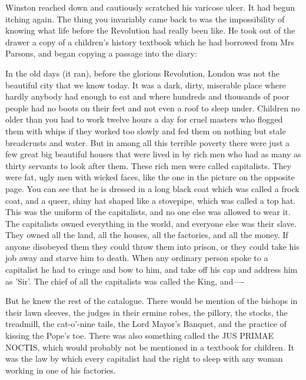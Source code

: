 \documentclass{article}
\begin{document}
Winston reached down and cautiously scratched his varicose ulcer. It
had begun itching again. The thing you invariably came back to was the
impossibility of knowing what life before the Revolution had really been
like. He took out of the drawer a copy of a children's history textbook
which he had borrowed from Mrs Parsons, and began copying a passage into
the diary:


   In the old days (it ran), before the glorious Revolution, London was
not the beautiful city that we know today. It was a dark, dirty, miserable
place where hardly anybody had enough to eat and where hundreds and
thousands of poor people had no boots on their feet and not even a roof to
sleep under. Children no older than you had to work twelve hours a day for
cruel masters who flogged them with whips if they worked too slowly and
fed them on nothing but stale breadcrusts and water. But in among all
this terrible poverty there were just a few great big beautiful houses
that were lived in by rich men who had as many as thirty servants to look
after them. These rich men were called capitalists. They were fat, ugly
men with wicked faces, like the one in the picture on the opposite page.
You can see that he is dressed in a long black coat which was called a
frock coat, and a queer, shiny hat shaped like a stovepipe, which was
called a top hat. This was the uniform of the capitalists, and no one else
was allowed to wear it. The capitalists owned everything in the world, and
everyone else was their slave. They owned all the land, all the houses,
all the factories, and all the money. If anyone disobeyed them they could
throw them into prison, or they could take his job away and starve him to
death. When any ordinary person spoke to a capitalist he had to cringe and
bow to him, and take off his cap and address him as 'Sir'. The chief of
all the capitalists was called the King, and----


But he knew the rest of the catalogue. There would be mention of the
bishops in their lawn sleeves, the judges in their ermine robes, the
pillory, the stocks, the treadmill, the cat-o'-nine tails, the Lord Mayor's
Banquet, and the practice of kissing the Pope's toe. There was also
something called the JUS PRIMAE NOCTIS, which would probably not be
mentioned in a textbook for children. It was the law by which every
capitalist had the right to sleep with any woman working in one of his
factories.
\end{document}
